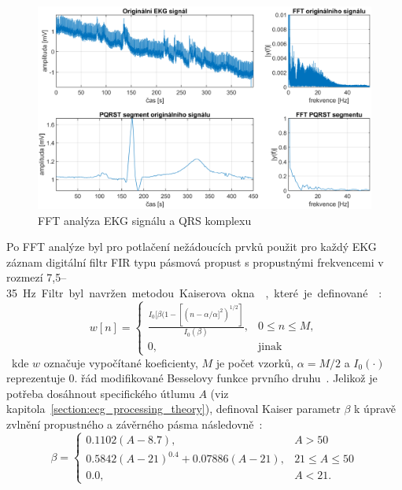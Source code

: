 \begin{figure}[h]
    \begin{center}
        \includegraphics[width=1\textwidth]{../assets/figures/spectral_analysis}
        \caption{FFT analýza EKG signálu a QRS komplexu}
        \label{fig:spectral_analysis}
    \end{center}
\end{figure}

Po FFT analýze byl pro potlačení nežádoucích prvků použit pro každý EKG záznam
digitální filtr FIR typu pásmová propust s propustnými frekvencemi v rozmezí
7,5--35~\si\Hz. Filtr byl navržen metodou Kaiserova okna~\cite{Chavan2006},
které je definované~\cite{Oppenheim1999}:
\begin{equation}
    \label{eq:kaiser1}
    w[n] =
    \begin{cases}
        \frac{I_0[\beta(1-[(n-\alpha/\alpha]^2)^{1/2}]}{I_0(\beta)}, & 0 \leq n \leq M, \\
        0,                                                           & \text{jinak}
    \end{cases}
\end{equation}
kde $w$ označuje vypočítané koeficienty, $M$ je počet vzorků, $\alpha=M/2$ a
$I_0(\cdot)$ reprezentuje 0. řád modifikované Besselovy funkce prvního
druhu~\cite{BesselFcn}. Jelikož je potřeba dosáhnout specifického útlumu $A$
(viz kapitola~\ref{section:ecg_processing_theory}), definoval Kaiser parametr
$\beta$ k úpravě zvlnění propustného a závěrného pásma
následovně~\cite{Oppenheim1999}:
\begin{equation}
    \beta =
    \begin{cases}
        0.1102(A-8.7),                    & A > 50            \\
        0.5842(A-21)^0.4 + 0.07886(A-21), & 21 \leq A \leq 50 \\
        0.0,                              & A < 21.
    \end{cases}
\end{equation}

